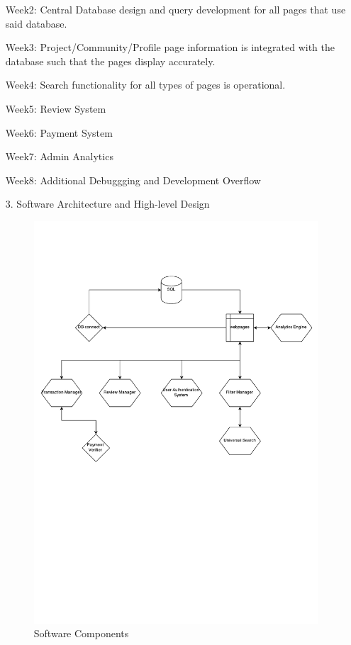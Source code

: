 \documentclass[12pt]{article}
\begin{document}
\begin{enumerate}
Week2: Central Database design and query development for all pages that use said database.

Week3: Project/Community/Profile page information is integrated with the database such that the pages display accurately.

Week4: Search functionality for all types of pages is operational.

Week5: Review System

Week6: Payment System

Week7: Admin Analytics

Week8: Additional Debuggging and Development Overflow

\item[3.] Software Architecture and High-level Design
\begin{figure}[ht!]
\centering
\includegraphics[width=150mm]{swag.pdf}
\caption{Software Components \label{overflow}}
\end{figure}


\end{enumerate}
\end{document}
